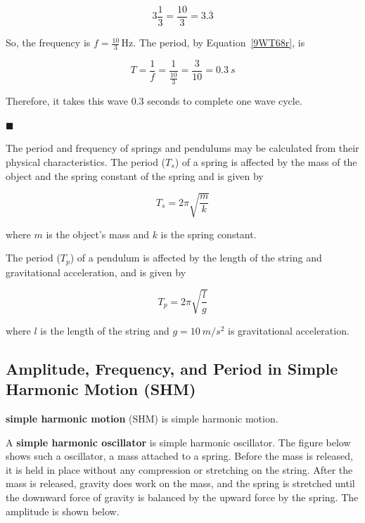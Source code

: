 \documentclass[dvipsnames]{article}
\begin{document}
\begin{equation*}
    3 \frac{1}{3} = \frac{10}{3} = 3.\overline{3}
\end{equation*}

So, the frequency is $f = \frac{10}{3}\,\text{Hz}$. The period, by Equation~\eqref{9WT68r}, is

\begin{equation*}
    T = \frac{1}{f} = \frac{1}{\frac{10}{3}} = \frac{3}{10}  = \SI{0.3}{s}
\end{equation*}

Therefore, it takes this wave 0.3 seconds to complete one wave cycle. 

\hfill $\blacksquare$

The period and frequency of springs and pendulums may be calculated from their physical characteristics. The period ($T_s$) of a spring is affected by the mass of the object and the spring constant of the spring and is given by

\begin{equation}
    T_s = 2\pi \sqrt{\frac{m}{k}}
\end{equation}

where $m$ is the object's mass and $k$ is the spring constant.

The period ($T_p$) of a pendulum is affected by the length of the string and gravitational acceleration, and is given by 

\begin{equation}
    T_p = 2\pi \sqrt{\frac{l}{g}}
\end{equation}

where $l$ is the length of the string and $g = \SI{10}{m/s^2}$ is gravitational acceleration.



\subsection{Amplitude, Frequency, and Period in Simple Harmonic Motion (SHM)}

\textbf{\Gls{simple harmonic motion}} (SHM) is \glsdesc{simple harmonic motion}.

A \textbf{\gls{simple harmonic oscillator}} is \glsdesc{simple harmonic oscillator}. The figure below shows such a oscillator, a mass attached to a spring. Before the mass is released, it is held in place without any compression or stretching on the string. After the mass is released, gravity does work on the mass, and the spring is stretched until the downward force of gravity is balanced by the upward force by the spring. The amplitude is shown below.
\end{document}
